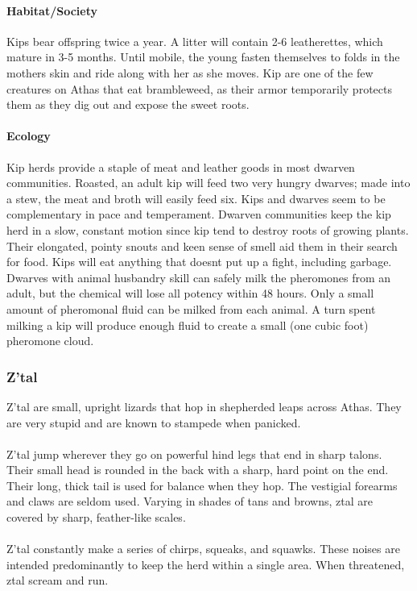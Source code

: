 \paragraph{Habitat/Society}
 Kips bear offspring twice a year. A litter will
contain 2-6 leatherettes, which mature in 3-5 months. Until mobile,
the young fasten themselves to folds in the mothers skin
and ride along with her as she moves. Kip are one of the few
creatures on Athas that eat brambleweed, as their armor
temporarily protects them as they dig out and expose the sweet roots.

\paragraph{Ecology}
Kip herds provide a staple of meat and leather goods in
most dwarven communities. Roasted, an adult kip will feed two
very hungry dwarves; made into a stew, the meat and broth will
easily feed six. Kips and dwarves seem to be complementary in
pace and temperament. Dwarven communities keep the kip
herd in a slow, constant motion since kip tend to destroy roots
of growing plants. Their elongated, pointy snouts and keen
sense of smell aid them in their search for food. Kips will eat
anything that doesnt put up a fight, including garbage.
Dwarves with animal husbandry skill can safely milk the
pheromones from an adult, but the chemical will lose all potency
within 48 hours. Only a small amount of pheromonal fluid
can be milked from each animal. A turn spent milking a kip will
produce enough fluid to create a small (one cubic foot) pheromone
cloud.

\subsubsection{Z'tal}
Z'tal are small, upright lizards that hop in shepherded leaps
across Athas. They are very stupid and are known to stampede
when panicked.\\
\\
Z'tal jump wherever they go on powerful hind legs that end in
sharp talons. Their small head is rounded in the back with a
sharp, hard point on the end. Their long, thick tail is used for
balance when they hop. The vestigial forearms and claws are
seldom used. Varying in shades of tans and browns, ztal are
covered by sharp, feather-like scales.\\
\\
Z'tal constantly make a series of chirps, squeaks, and
squawks. These noises are intended predominantly to keep the
herd within a single area. When threatened, ztal scream and
run.

